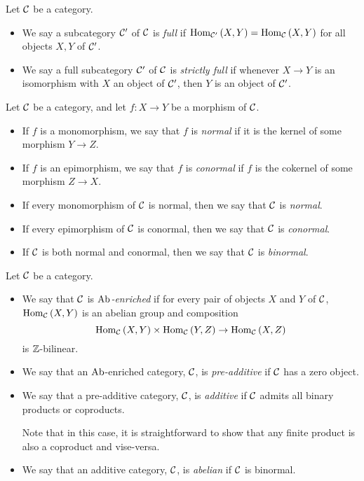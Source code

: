 \documentclass[dissertation.tex]{subfiles}
\begin{document}
\begin{defn}
  Let $\mathcal{C}$ be a category.
  \begin{itemize}
  \item
    We say a subcategory $\mathcal{C}^\prime$ of $\mathcal{C}$ is {\it full} if 
    $\operatorname{Hom}_{\mathcal{C}^\prime}\left(X,Y\right) = \operatorname{Hom}_{\mathcal{C}}\left(X,Y\right)$
    for all objects $X,Y$ of $\mathcal{C}^\prime$.
  \item
    We say a full subcategory $\mathcal{C}^\prime$ of $\mathcal{C}$ is {\it strictly full} if whenever $X \rightarrow Y$ is an isomorphism with $X$ an object of $\mathcal{C}^\prime$, then $Y$ is an object of $\mathcal{C}^\prime$.
  \end{itemize}
\end{defn}

\begin{defn}
  Let $\mathcal{C}$ be a category, and let $f : X \to Y$ be a morphism of $\mathcal{C}$.
  \begin{itemize}
    \item
      If $f$ is a monomorphism, we say that $f$ is {\it normal} if it is the kernel of some morphism $Y \rightarrow Z$.
    \item
      If $f$ is an epimorphism, we say that $f$ is {\it conormal} if $f$ is the cokernel of some morphism $Z \rightarrow X$.
    \item
      If every monomorphism of $\mathcal{C}$ is normal, then we say that $\mathcal{C}$ is {\it normal}.
    \item
      If every epimorphism of $\mathcal{C}$ is conormal, then we say that $\mathcal{C}$ is {\it conormal}.
    \item
      If $\mathcal{C}$ is both normal and conormal, then we say that $\mathcal{C}$ is {\it binormal}.
  \end{itemize}
  
\end{defn}

\begin{defn}
  Let $\mathcal{C}$ be a category.
  \begin{itemize}
  \item
    We say that $\mathcal{C}$ is {\it $\operatorname{Ab}$-enriched} if for every pair of objects $X$ and $Y$ of $\mathcal{C}$, $\operatorname{Hom}_{\mathcal{C}}\left(X,Y\right)$ is an abelian group and composition 
    $$\operatorname{Hom}_{\mathcal{C}}\left(X,Y\right) \times \operatorname{Hom}_{\mathcal{C}}\left(Y,Z\right) \rightarrow \operatorname{Hom}_{\mathcal{C}}\left(X,Z\right)$$
    is $\mathbb{Z}$-bilinear.
  \item
    We say that an $\operatorname{Ab}$-enriched category, $\mathcal{C}$, is {\it pre-additive} if $\mathcal{C}$ has a zero object.
  \item
    We say that a pre-additive category, $\mathcal{C}$, is {\it additive} if $\mathcal{C}$ admits all binary products or coproducts.
    \begin{rmk}
      Note that in this case, it is straightforward to show that any finite product is also a coproduct and vise-versa.
    \end{rmk}
  \item
    We say that an additive category, $\mathcal{C}$, is {\it abelian} if $\mathcal{C}$ is binormal.
  \end{itemize}
\end{defn}
\end{document}
